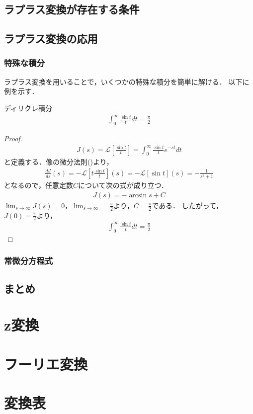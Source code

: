 \subsection{ラプラス変換が存在する条件}

\subsection{ラプラス変換の応用}

\subsubsection{特殊な積分}

ラプラス変換を用いることで，いくつかの特殊な積分を簡単に解ける．
以下に例を示す．

\begin{exprbox}{ディリクレ積分}
    \begin{eqnarray}
        \int_{0}^{\infty} \frac{\sin t}{t} dt = \frac{\pi}{2}
    \end{eqnarray}
    \begin{proof}
        \begin{eqnarray*}
            J(s) = \mathcal{L}\left[\frac{\sin t}{t}\right] = \int_{0}^{\infty} \frac{\sin t}{t} e^{-st} dt
        \end{eqnarray*}
        と定義する．像の微分法則()より，
        \begin{eqnarray*}
            \frac{dJ}{ds}(s) = - \mathcal{L}\left[t \frac{\sin t}{t}\right](s) = -\mathcal{L}[\sin t](s) = - \frac{1}{s^2 + 1}
        \end{eqnarray*}
        となるので，任意定数$C$について次の式が成り立つ．
        \begin{eqnarray*}
            J(s) = -\arcsin s + C
        \end{eqnarray*}
        $\lim_{s \to \infty} J(s) = 0$，$\lim_{s \to \infty} = \frac{\pi}{2}$より，$C = \frac{\pi}{2}$である．
        したがって，$J(0) = \frac{\pi}{2}$より，
        \begin{eqnarray*}
            \int_{0}^{\infty} \frac{\sin t}{t} dt = \frac{\pi}{2}
        \end{eqnarray*}
    \end{proof}
\end{exprbox}

\subsubsection{常微分方程式}

\subsection{まとめ}

\section{z変換}\label{sec:z_transform}

\section{フーリエ変換}\label{sec:fourier_transform}

\section{変換表}